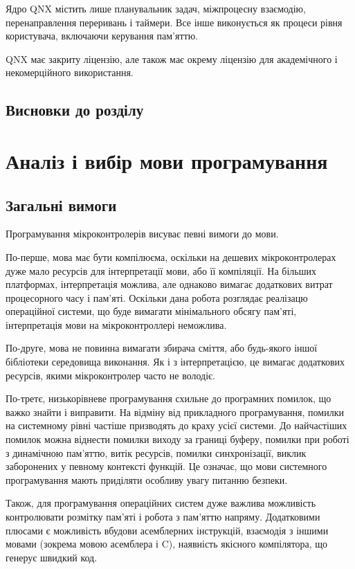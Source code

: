 \documentclass[oneside,14pt,a4paper,final]{myextreport}
\newcommand{\specialsection}[1]{\section*{#1}\addcontentsline{toc}{section}{#1}}
\newcommand{\chapterconslusions}{
  \clearpage
  \specialsection{Висновки до розділу \thechapter}
}
\begin{document}
Ядро QNX містить лише планувальник задач, міжпроцесну взаємодію, перенаправлення переривань і таймери. Все інше виконується як процеси рівня користувача, включаючи керування пам'яттю.

QNX має закриту ліцензію, але також має окрему ліцензію для академічного і некомерційного використання\cite{qnx:noncommercial}.


\chapterconslusions{}

\chapter{Аналіз і вибір мови програмування}

\newcommand\LangC{C}

\section{Загальні вимоги}

Програмування мікроконтролерів висуває певні вимоги до мови.

По-перше, мова має бути компілюєма, оскільки на дешевих мікроконтролерах дуже мало ресурсів для інтерпретації мови, або її компіляції. На більших платформах, інтерпретація можлива, але однаково вимагає додаткових витрат процесорного часу і пам'яті. Оскільки дана робота розглядає реалізацю операційної системи, що буде вимагати мінімального обсягу пам'яті, інтерпретація мови на мікроконтроллері неможлива.

По-друге, мова не повинна вимагати збирача сміття, або будь-якого іншої бібліотеки середовища виконання. Як і з інтерпретацією, це вимагає додаткових ресурсів, якими мікроконтролер часто не володіє.

По-третє, низькорівневе програмування схильне до програмних помилок, що важко знайти і виправити. На відміну від прикладного програмування, помилки на системному рівні частіше призводять до краху усієї системи. До найчастіших помилок можна віднести помилки виходу за границі буферу, помилки при роботі з динамічною пам'яттю, витік ресурсів, помилки синхронізації, виклик заборонених у певному контексті функцій. Це означає, що мови системного програмування мають приділяти особливу увагу питанню безпеки.

Також, для програмування операційних систем дуже важлива можливість контролювати розмітку пам'яті і робота з пам'яттю напряму. Додатковими плюсами є можливість вбудови асемблерних інструкцій, взаємодія з іншими мовами (зокрема мовою асемблера і \LangC{}), наявність якісного компілятора, що генерує швидкий код.
\end{document}

